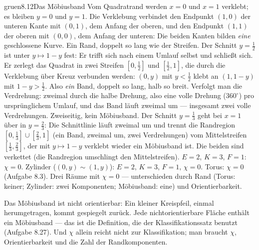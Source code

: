 \begin{loesungkarte}{gruen}{8.12}{Das Möbiusband}
Vom Quadratrand werden $x = 0$ und $x = 1$ verklebt; es bleiben $y = 0$ und $y = 1$. Die Verklebung verbindet den Endpunkt $(1, 0)$ der unteren Kante mit $(0, 1)$, dem Anfang der oberen, und den Endpunkt $(1, 1)$ der oberen mit $(0, 0)$, dem Anfang der unteren: Die beiden Kanten bilden \emph{eine} geschlossene Kurve. Ein Rand, doppelt so lang wie der Streifen.
Der Schnitt $y = \frac12$ ist unter $y\mapsto1 - y$ fest: Er trifft sich nach einem Umlauf selbst und schließt sich. Er zerlegt das Quadrat in zwei Streifen $[0, \frac12]$ und $[\frac12, 1]$, die durch die Verklebung über Kreuz verbunden werden: $(0, y)$ mit $y < \frac12$ klebt an $(1, 1 - y)$ mit $1 - y > \frac12$. Also \emph{ein} Band, doppelt so lang, halb so breit. Verfolgt man die Verdrehung: zweimal durch die halbe Drehung, also eine volle Drehung ($360^{\circ}$) pro ursprünglichem Umlauf, und das Band läuft zweimal um --- insgesamt zwei volle Verdrehungen. Zweiseitig, kein Möbiusband.
Der Schnitt $y = \frac13$ geht bei $x = 1$ über in $y = \frac23$: Die Schnittlinie läuft zweimal um und trennt die Randregion $[0, \frac13]\cup[\frac23, 1]$ (ein Band, zweimal um, zwei Verdrehungen) vom Mittelstreifen $[\frac13, \frac23]$, der mit $y\mapsto1 - y$ verklebt wieder ein Möbiusband ist. Die beiden sind verkettet (die Randregion umschlingt den Mittelstreifen).
$E = 2$, $K = 3$, $F = 1$: $\chi = 0$. Zylinder ($(0, y)\sim(1, y)$): $E = 2$, $K = 3$, $F = 1$, $\chi = 0$. Torus: $\chi = 0$ (Aufgabe 8.3). Drei Räume mit $\chi = 0$ --- unterschieden durch Rand (Torus: keiner; Zylinder: zwei Komponenten; Möbiusband: eine) und Orientierbarkeit.
\begin{mitnehmen}\kastentext
Das Möbiusband ist nicht orientierbar: Ein kleiner Kreispfeil, einmal herumgetragen, kommt gespiegelt zurück. Jede nichtorientierbare Fläche enthält ein Möbiusband --- das ist die Definition, die der Klassifikationssatz benutzt (Aufgabe 8.27). Und $\chi$ allein reicht nicht zur Klassifikation; man braucht $\chi$, Orientierbarkeit und die Zahl der Randkomponenten.
\end{mitnehmen}
\end{loesungkarte}

